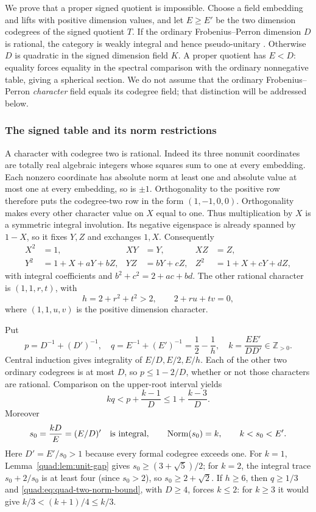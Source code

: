 \documentclass[11pt,a4paper]{article}
\theoremstyle{definition}\newtheorem{definition}[theorem]{Definition}
\theoremstyle{remark}\newtheorem{remark}[theorem]{Remark}
\newcommand{\ZZ}{\mathbb Z}
\numberwithin{equation}{section}
\begin{document}
We prove that a proper signed quotient is impossible. Choose a field
embedding and lifts with positive dimension values, and let $E\ge E'$
be the two dimension codegrees of the signed quotient $T$.
If the ordinary Frobenius--Perron dimension $D$ is rational, the
category is weakly integral and hence pseudo-unitary \cite{ENO}.
Otherwise $D$ is quadratic in the signed dimension field $K$.
A proper quotient has $E<D$: equality forces equality in the spectral
comparison with the ordinary nonnegative table, giving a spherical
section. We do not assume that the ordinary Frobenius--Perron
\emph{character} field equals its codegree field; that distinction
will be addressed below.

\subsubsection{The signed table and its norm restrictions}

A character with codegree two is rational. Indeed its three nonunit
coordinates are totally real algebraic integers whose squares sum to
one at every embedding. Each nonzero coordinate has absolute norm at
least one and absolute value at most one at every embedding, so is
$\pm1$. Orthogonality to the positive row therefore puts the
codegree-two row in the form $(1,-1,0,0)$. Orthogonality makes every other character
value on $X$ equal to one. Thus multiplication by $X$ is a symmetric
integral involution. Its negative eigenspace is already spanned by
$1-X$, so it fixes $Y,Z$ and exchanges $1,X$. Consequently
\begin{equation}\label{quad:eq:quad-two-table}
 \begin{aligned}
 X^2&=1,&XY&=Y,&XZ&=Z,\\
 Y^2&=1+X+aY+bZ,&YZ&=bY+cZ,&Z^2&=1+X+cY+dZ,
 \end{aligned}
\end{equation}
with integral coefficients and $b^2+c^2=2+ac+bd$.
The other rational character is $(1,1,r,t)$, with
\[
 h=2+r^2+t^2>2,\qquad 2+ru+tv=0,
\]
where $(1,1,u,v)$ is the positive dimension character.

Put
\[
 p=D^{-1}+(D')^{-1},\quad q=E^{-1}+(E')^{-1}=\frac12-\frac1h,
 \quad k=\frac{EE'}{DD'}\in\ZZ_{>0}.
\]
Central induction gives integrality of $E/D,E/2,E/h$.
Each of the other two ordinary codegrees is at most $D$, so
$p\le1-2/D$, whether or not those characters are rational.
Comparison on the upper-root interval yields
\begin{equation}\label{quad:eq:quad-two-norm-bound}
 kq<p+\frac{k-1}{D}\le1+\frac{k-3}{D}.
\end{equation}
Moreover
\begin{equation}\label{quad:eq:quad-two-small-conjugate}
 s_0=\frac{kD}{E}=(E/D)'\quad\hbox{is integral},\qquad
 \operatorname{Norm}(s_0)=k,\qquad k<s_0<E'.
\end{equation}
Here $D'=E'/s_0>1$ because every formal codegree exceeds one.
For $k=1$, Lemma~\ref{quad:lem:unit-gap} gives $s_0\ge(3+\sqrt5)/2$;
for $k=2$, the integral trace $s_0+2/s_0$ is at least four
(since $s_0>2$), so $s_0\ge2+\sqrt2$.
If $h\ge6$, then $q\ge1/3$ and
\eqref{quad:eq:quad-two-norm-bound}, with $D\ge4$, forces $k\le2$:
for $k\ge3$ it would give
$k/3<(k+1)/4\le k/3$.
\end{document}
